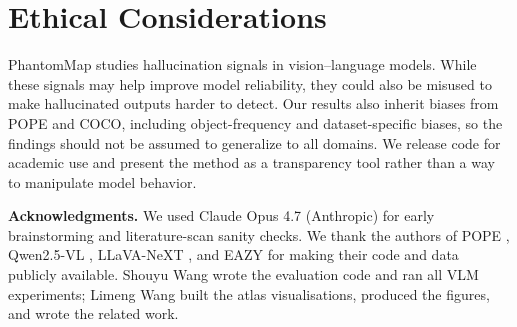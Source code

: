 \documentclass[10pt,twocolumn,letterpaper]{article}
\begin{document}
\section{Ethical Considerations}

PhantomMap studies hallucination signals in vision--language models. While these signals may help improve model reliability, they could also be misused to make hallucinated outputs harder to detect. Our results also inherit biases from POPE and COCO, including object-frequency and dataset-specific biases, so the findings should not be assumed to generalize to all domains. We release code for academic use and present the method as a transparency tool rather than a way to manipulate model behavior.

\noindent
{\bf Acknowledgments.} We used Claude Opus 4.7 (Anthropic) for early
brainstorming and literature-scan sanity checks. We thank the authors
of POPE \cite{pope}, Qwen2.5-VL \cite{qwen25vl}, LLaVA-NeXT
\cite{llavanext}, and EAZY \cite{eazy} for making their code and data
publicly available. Shouyu Wang wrote the evaluation code and ran all
VLM experiments; Limeng Wang built the atlas visualisations, produced
the figures, and wrote the related work.

{\small


}
\end{document}
